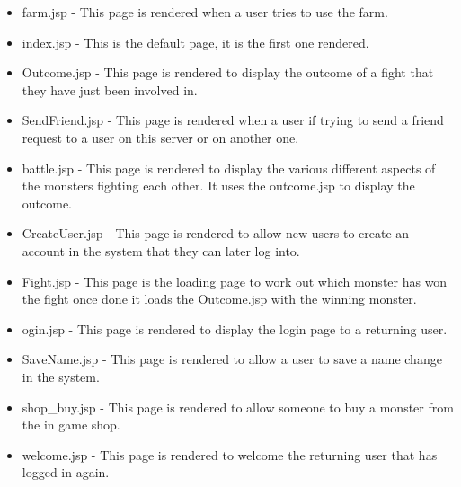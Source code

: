 \documentclass[titlepage]{article}
\begin{document}
{\begin{itemize}
\item {farm.jsp - This page is rendered when a user tries to use the farm.}
\item {index.jsp - This is the default page, it is the first one rendered.}
\item {Outcome.jsp - This page is rendered to display the outcome of a fight that they have just been involved in.}
\item {SendFriend.jsp - This page is rendered when a user if trying to send a friend request to a user on this server or on another one.}
\item {battle.jsp - This page is rendered to display the various different aspects of the monsters fighting each other. It uses the outcome.jsp to display the outcome.}
\item {CreateUser.jsp - This page is rendered to allow new users to create an account in the system that they can later log into.}
\item {Fight.jsp - This page is the loading page to work out which monster has won the fight once done it loads the Outcome.jsp with the winning monster.}
\item {ogin.jsp - This page is rendered to display the login page to  a returning user.}
\item {SaveName.jsp - This page is rendered to allow a user to save a name change in the system.}
\item {shop\_buy.jsp - This page is rendered to allow someone to buy a monster from the in game shop.}
\item {welcome.jsp - This page is rendered to welcome the returning user that has logged in again.}
\end{itemize}
}
\end{document}
